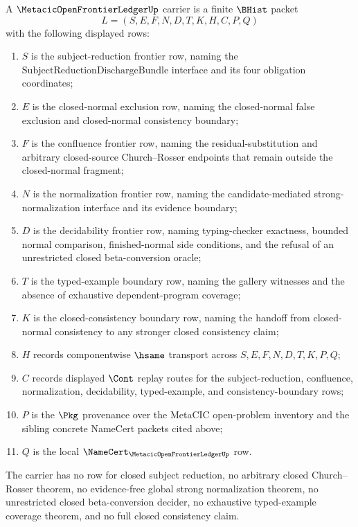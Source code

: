 \begin{definition}
\label{def:metacic-open-frontier-ledger-carrier}
A $\MetacicOpenFrontierLedgerUp$ carrier is a finite $\BHist$ packet
$$
L=(S,E,F,N,D,T,K,H,C,P,Q)
$$
with the following displayed rows:
\begin{enumerate}
\item $S$ is the subject-reduction frontier row, naming the $\mathrm{SubjectReductionDischargeBundle}$ interface and its four obligation coordinates;
\item $E$ is the closed-normal exclusion row, naming the closed-normal false exclusion and closed-normal consistency boundary;
\item $F$ is the confluence frontier row, naming the residual-substitution and arbitrary closed-source Church--Rosser endpoints that remain outside the closed-normal fragment;
\item $N$ is the normalization frontier row, naming the candidate-mediated strong-normalization interface and its evidence boundary;
\item $D$ is the decidability frontier row, naming typing-checker exactness, bounded normal comparison, finished-normal side conditions, and the refusal of an unrestricted closed beta-conversion oracle;
\item $T$ is the typed-example boundary row, naming the gallery witnesses and the absence of exhaustive dependent-program coverage;
\item $K$ is the closed-consistency boundary row, naming the handoff from closed-normal consistency to any stronger closed consistency claim;
\item $H$ records componentwise $\hsame$ transport across $S,E,F,N,D,T,K,P,Q$;
\item $C$ records displayed $\Cont$ replay routes for the subject-reduction, confluence, normalization, decidability, typed-example, and consistency-boundary rows;
\item $P$ is the $\Pkg$ provenance over the MetaCIC open-problem inventory and the sibling concrete NameCert packets cited above;
\item $Q$ is the local $\NameCert_{\MetacicOpenFrontierLedgerUp}$ row.
\end{enumerate}
The carrier has no row for closed subject reduction, no arbitrary closed Church--Rosser theorem, no evidence-free global strong normalization theorem, no unrestricted closed beta-conversion decider, no exhaustive typed-example coverage theorem, and no full closed consistency claim.
\end{definition}

